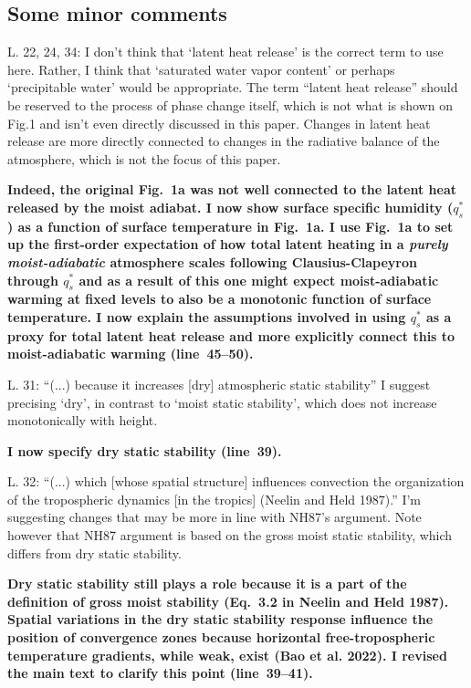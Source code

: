 \documentclass{article}
\begin{document}
\subsection*{Some minor comments}
L. 22, 24, 34: I don't think that `latent heat release' is the correct term to use here. Rather, I think that `saturated water vapor content' or perhaps `precipitable water' would be appropriate. The term ``latent heat release'' should be reserved to the process of phase change itself, which is not what is shown on Fig.1 and isn't even directly discussed in this paper. Changes in latent heat release are more directly connected to changes in the radiative balance of the atmosphere, which is not the focus of this paper.
\par
\textbf{Indeed, the original Fig.~1a was not well connected to the latent heat released by the moist adiabat. I now show surface specific humidity ($q_s^*$) as a function of surface temperature in Fig.~1a. I use Fig.~1a to set up the first-order expectation of how total latent heating in a \textit{purely moist-adiabatic} atmosphere scales following Clausius-Clapeyron through $q_s^*$ and as a result of this one might expect moist-adiabatic warming at fixed levels to also be a monotonic function of surface temperature.  I now explain the assumptions involved in using $q_s^*$ as a proxy for total latent heat release and more explicitly connect this to moist-adiabatic warming (line~45--50).}
\par
L. 31: “(...) because it increases [dry] atmospheric static stability” I suggest precising `dry', in contrast to `moist static stability', which does not increase monotonically with height.
\par
\textbf{I now specify dry static stability (line~39).}
\par
L. 32: ``(...) which [whose spatial structure] influences convection the organization of the tropospheric dynamics [in the tropics] (Neelin and Held 1987).'' I'm suggesting changes that may be more in line with NH87's argument. Note however that NH87 argument is based on the gross moist static stability, which differs from dry static stability.
\par
\textbf{Dry static stability still plays a role because it is a part of the definition of gross moist stability (Eq.~3.2 in Neelin and Held 1987). Spatial variations in the dry static stability response influence the position of convergence zones because horizontal free-tropospheric temperature gradients, while weak, exist (Bao et al. 2022). I revised the main text to clarify this point (line~39--41).}
\end{document}
